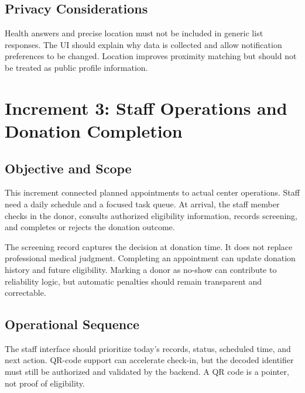 
\subsection{Privacy Considerations}
Health answers and precise location must not be included in generic list responses. The UI should explain why data is collected and allow notification preferences to be changed. Location improves proximity matching but should not be treated as public profile information.

\section{Increment 3: Staff Operations and Donation Completion}
\subsection{Objective and Scope}
This increment connected planned appointments to actual center operations. Staff need a daily schedule and a focused task queue. At arrival, the staff member checks in the donor, consults authorized eligibility information, records screening, and completes or rejects the donation outcome.

The screening record captures the decision at donation time. It does not replace professional medical judgment. Completing an appointment can update donation history and future eligibility. Marking a donor as no-show can contribute to reliability logic, but automatic penalties should remain transparent and correctable.

\subsection{Operational Sequence}
The staff interface should prioritize today's records, status, scheduled time, and next action. QR-code support can accelerate check-in, but the decoded identifier must still be authorized and validated by the backend. A QR code is a pointer, not proof of eligibility.

